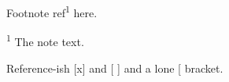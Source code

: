 Footnote ref\textsuperscript{1} here.

\textsuperscript{1} The note text.

Reference-ish [x] and [ ] and a lone [ bracket.
